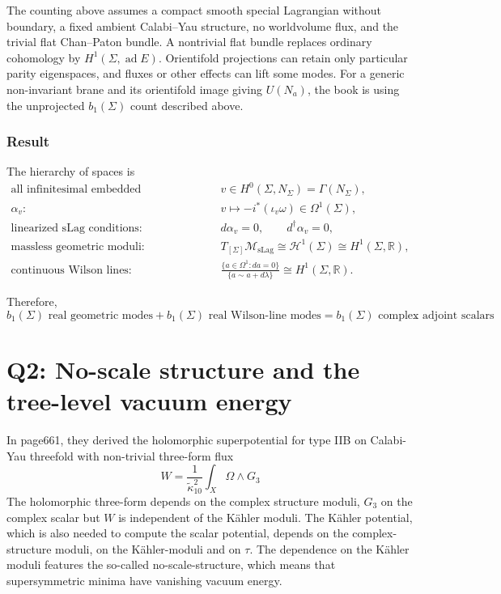 \documentclass[
  10pt,
  a4paper,
  openany]{book}
\begin{document}
The counting above assumes a compact smooth special Lagrangian without
boundary, a fixed ambient Calabi--Yau structure, no worldvolume flux,
and the trivial flat Chan--Paton bundle. A nontrivial flat bundle
replaces ordinary cohomology by \(H^1(\Sigma,\operatorname{ad}E)\).
Orientifold projections can retain only particular parity eigenspaces,
and fluxes or other effects can lift some modes. For a generic
non-invariant brane and its orientifold image giving \(U(N_a)\), the
book is using the unprojected \(b_1(\Sigma)\) count described above.

\subsubsection{Result}\label{result-34}

The hierarchy of spaces is \[
\boxed{
\begin{aligned}
\text{all infinitesimal embedded deformations:}
&\quad
v\in H^0(\Sigma,N_\Sigma)=\Gamma(N_\Sigma),\\[2mm]
\alpha_v:
&\quad
v\longmapsto-i^*(\iota_v\omega)
\in\Omega^1(\Sigma),\\[2mm]
\text{linearized sLag conditions:}
&\quad
d\alpha_v=0,
\qquad
d^\dagger\alpha_v=0,\\[2mm]
\text{massless geometric moduli:}
&\quad
T_{[\Sigma]}\mathcal M_{\mathrm{sLag}}
\cong\mathcal H^1(\Sigma)
\cong H^1(\Sigma,\mathbb R),\\[2mm]
\text{continuous Wilson lines:}
&\quad
\frac{\{a\in\Omega^1:da=0\}}
{\{a\sim a+d\lambda\}}
\cong H^1(\Sigma,\mathbb R).
\end{aligned}
}
\]

Therefore, \[
\boxed{
b_1(\Sigma)\text{ real geometric modes}
+b_1(\Sigma)\text{ real Wilson-line modes}
=b_1(\Sigma)\text{ complex adjoint scalars}
}.
\]

\section{Q2: No-scale structure and the tree-level vacuum
energy}\label{q2-no-scale-structure-and-the-tree-level-vacuum-energy}

In page661, they derived the holomorphic superpotential for type IIB on
Calabi-Yau threefold with non-trivial three-form flux \[
W=\frac{1}{\tilde{\kappa}_{10}^2} \int_{X}\Omega \wedge G_{3}
\] The holomorphic three-form depends on the complex structure moduli,
\(G_{3}\) on the complex scalar but \(W\) is independent of the Kähler
moduli. The Kähler potential, which is also needed to compute the scalar
potential, depends on the complex-structure moduli, on the Kähler-moduli
and on \(\tau\). The dependence on the Kähler moduli features the
so-called no-scale-structure, which means that supersymmetric minima
have vanishing vacuum energy.
\end{document}
